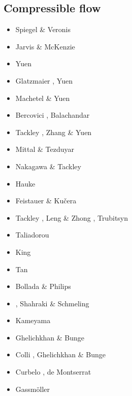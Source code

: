 \subsection{Compressible flow}

\begin{scriptsize}
\begin{itemize}
\item[\nineteensixty] Spiegel \& Veronis \cite{spve60}
\item[\nineteeneighty] Jarvis \& McKenzie \cite{jamc80}
\item[\nineteeneightyseven]  Yuen \etal \cite{yuqh87}
\item[\nineteeneightyeight] Glatzmaier \cite{glat88}, Yuen \etal \cite{yuzl88} 
\item[\nineteeneightynine] Machetel \& Yuen \cite{mayu89} 
\item[\nineteenninetytwo] Bercovici \etal \cite{besg92}, Balachandar \etal \cite{bayr92}
\item[\nineteenninetysix] Tackley \cite{tack96}, Zhang \& Yuen \cite{zhyu96}
\item[\nineteenninetyeight] Mittal \& Tezduyar \cite{mite98} 
\item[\twothousandfour] Nakagawa \& Tackley \cite{nata04}
\item[\twothousandfive] Hauke \etal \cite{halg05a,halg05b}
\item[\twothousandseven] Feistauer \& Ku{\v{c}}era \cite{feku07} 
\item[\twothousandeight] Tackley \cite{tack08}, Leng \& Zhong \cite{lezh08}, Trubitsyn \cite{trub08}
\item[\twothousandnine] Taliadorou \etal \cite{tagm09} 
\item[\twothousandten] King \etal \cite{kilv10}
\item[\twothousandeleven] Tan \etal \cite{talz11}
\item[\twothousandtwelve] Bollada \& Philips \cite{boph12}
\item[\twothousandthirteen] \cite{lizh13}, Shahraki \& Schmeling \cite{shsc13}
\item[\twothousandfifteen] Kameyama \etal \cite{kamo15}
\item[\twothousandsixteen] Ghelichkhan \& Bunge \cite{ghbu16}
\item[\twothousandeighteen] Colli \etal \cite{cogb18}, Ghelichkhan \& Bunge \cite{ghbu18}
\item[\twothousandnineteen] Curbelo \etal \cite{cuda19}, de Montserrat \etal \cite{demh19}
\item[\twothousandtwenty] Gassm{\"o}ller \etal \cite{gadb20}
\end{itemize}
\end{scriptsize}

